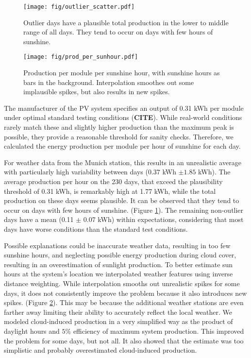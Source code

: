 \documentclass{article}
\begin{document}
\begin{figure}
	\texttt{[image: fig/outlier\_scatter.pdf]}
	\caption{Outlier days have a plausible total production in the lower to middle range of all days. They tend to occur on days with few hours of sunshine.}\label{fig:outlier_scatter}
\end{figure}
\begin{figure}
	\texttt{[image: fig/prod\_per\_sunhour.pdf]}
	\caption{Production per module per sunshine hour, with sunshine hours as bars in the background. Interpolation smoothes out some implausible spikes, but also results in new spikes.}\label{fig:prod_per_hour}
\end{figure}

The manufacturer of the PV system specifies an output of 0.31 kWh per module under optimal standard testing conditions (\textbf{CITE}). While real-world conditions rarely match these and slightly higher production than the maximum peak is possible, they provide a reasonable threshold for sanity checks. Therefore, we calculated the energy production per module per hour of sunshine for each day.

For weather data from the Munich station, this results in an unrealistic average with particularly high variability between days ($0.37$ kWh $\pm 1.85$ kWh). The average production per hour on the 230 days, that exceed the plausibility threshold of 0.31 kWh, is remarkably high at 1.77 kWh, while the total production on these days seems plausible. It can be observed that they tend to occur on days with few hours of sunshine. (Figure \ref{fig:outlier_scatter}).  The remaining non-outlier days have a mean (0.11 $\pm$ 0.07 kWh) within expectations, considering that most days have worse conditions than the standard test conditions. 

Possible explanations could be inaccurate weather data, resulting in too few sunshine hours, and neglecting possible energy production during cloud cover, resulting in an overestimation of sunlight production. To better estimate sun hours at the system's location we interpolated weather features using inverse distance weighting. While interpolation smooths out unrealistic spikes for some days, it does not consistently improve the problem because it also introduces new spikes. (Figure \ref{fig:prod_per_hour}). This may be because the additional weather stations are even farther away limiting their ability to accurately reflect the local weather. We modeled cloud-induced production in a very simplified way as the product of daylight hours and $5\%$ efficiency of maximum system production. This improved the problem for some days, but not all. It also showed that the estimate was too simplistic and probably overestimated cloud-induced production.
\end{document}
